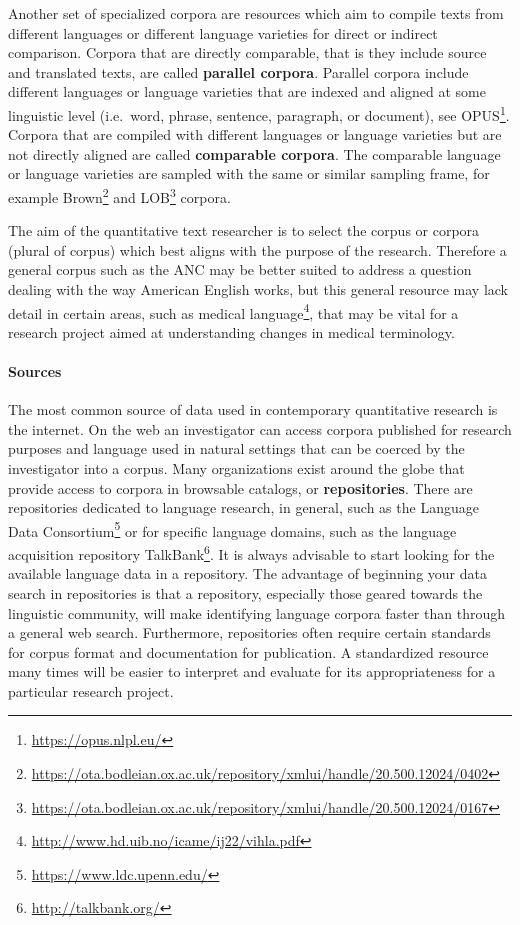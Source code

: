 \documentclass[
]{article}
\DeclareRobustCommand{\href}[2]{#2\footnote{\url{#1}}}
\begin{document}
Another set of specialized corpora are resources which aim to compile texts from different languages or different language varieties for direct or indirect comparison. Corpora that are directly comparable, that is they include source and translated texts, are called \textbf{parallel corpora}. Parallel corpora include different languages or language varieties that are indexed and aligned at some linguistic level (i.e.~word, phrase, sentence, paragraph, or document), see \href{https://opus.nlpl.eu/}{OPUS}. Corpora that are compiled with different languages or language varieties but are not directly aligned are called \textbf{comparable corpora}. The comparable language or language varieties are sampled with the same or similar sampling frame, for example \href{https://ota.bodleian.ox.ac.uk/repository/xmlui/handle/20.500.12024/0402}{Brown} and \href{https://ota.bodleian.ox.ac.uk/repository/xmlui/handle/20.500.12024/0167}{LOB} corpora.

The aim of the quantitative text researcher is to select the corpus or corpora (plural of corpus) which best aligns with the purpose of the research. Therefore a general corpus such as the ANC may be better suited to address a question dealing with the way American English works, but this general resource may lack detail in certain areas, such as \href{http://www.hd.uib.no/icame/ij22/vihla.pdf}{medical language}, that may be vital for a research project aimed at understanding changes in medical terminology.

\hypertarget{sources}{%
\paragraph{Sources}\label{sources}}

The most common source of data used in contemporary quantitative research is the internet. On the web an investigator can access corpora published for research purposes and language used in natural settings that can be coerced by the investigator into a corpus. Many organizations exist around the globe that provide access to corpora in browsable catalogs, or \textbf{repositories}. There are repositories dedicated to language research, in general, such as the \href{https://www.ldc.upenn.edu/}{Language Data Consortium} or for specific language domains, such as the language acquisition repository \href{http://talkbank.org/}{TalkBank}. It is always advisable to start looking for the available language data in a repository. The advantage of beginning your data search in repositories is that a repository, especially those geared towards the linguistic community, will make identifying language corpora faster than through a general web search. Furthermore, repositories often require certain standards for corpus format and documentation for publication. A standardized resource many times will be easier to interpret and evaluate for its appropriateness for a particular research project.
\end{document}
